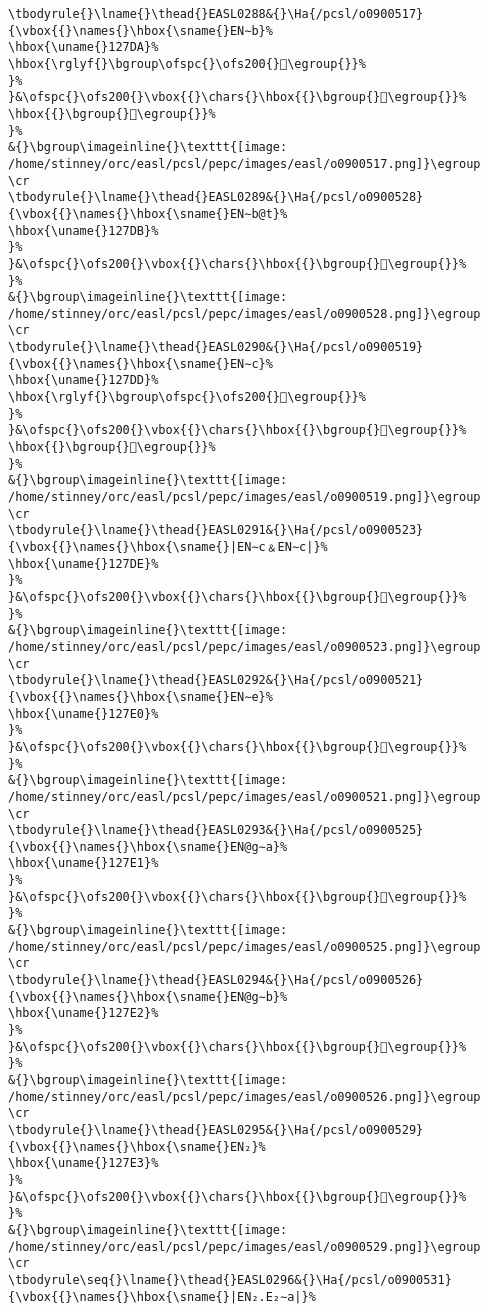 \begin{verbatim}
\tbodyrule{}\lname{}\thead{}EASL0288&{}\Ha{/pcsl/o0900517}{\vbox{{}\names{}\hbox{\sname{}EN∼b}%
\hbox{\uname{}127DA}%
\hbox{\rglyf{}\bgroup\ofspc{}\ofs200{}𒟚\egroup{}}%
}%
}&\ofspc{}\ofs200{}\vbox{{}\chars{}\hbox{{}\bgroup{}𒟚\egroup{}}%
\hbox{{}\bgroup{}𒟜\egroup{}}%
}%
&{}\bgroup\imageinline{}\texttt{[image: /home/stinney/orc/easl/pcsl/pepc/images/easl/o0900517.png]}\egroup
\cr
\tbodyrule{}\lname{}\thead{}EASL0289&{}\Ha{/pcsl/o0900528}{\vbox{{}\names{}\hbox{\sname{}EN∼b@t}%
\hbox{\uname{}127DB}%
}%
}&\ofspc{}\ofs200{}\vbox{{}\chars{}\hbox{{}\bgroup{}𒟛\egroup{}}%
}%
&{}\bgroup\imageinline{}\texttt{[image: /home/stinney/orc/easl/pcsl/pepc/images/easl/o0900528.png]}\egroup
\cr
\tbodyrule{}\lname{}\thead{}EASL0290&{}\Ha{/pcsl/o0900519}{\vbox{{}\names{}\hbox{\sname{}EN∼c}%
\hbox{\uname{}127DD}%
\hbox{\rglyf{}\bgroup\ofspc{}\ofs200{}𒟝\egroup{}}%
}%
}&\ofspc{}\ofs200{}\vbox{{}\chars{}\hbox{{}\bgroup{}𒟝\egroup{}}%
\hbox{{}\bgroup{}𒟟\egroup{}}%
}%
&{}\bgroup\imageinline{}\texttt{[image: /home/stinney/orc/easl/pcsl/pepc/images/easl/o0900519.png]}\egroup
\cr
\tbodyrule{}\lname{}\thead{}EASL0291&{}\Ha{/pcsl/o0900523}{\vbox{{}\names{}\hbox{\sname{}|EN∼c﹠EN∼c|}%
\hbox{\uname{}127DE}%
}%
}&\ofspc{}\ofs200{}\vbox{{}\chars{}\hbox{{}\bgroup{}𒟞\egroup{}}%
}%
&{}\bgroup\imageinline{}\texttt{[image: /home/stinney/orc/easl/pcsl/pepc/images/easl/o0900523.png]}\egroup
\cr
\tbodyrule{}\lname{}\thead{}EASL0292&{}\Ha{/pcsl/o0900521}{\vbox{{}\names{}\hbox{\sname{}EN∼e}%
\hbox{\uname{}127E0}%
}%
}&\ofspc{}\ofs200{}\vbox{{}\chars{}\hbox{{}\bgroup{}𒟠\egroup{}}%
}%
&{}\bgroup\imageinline{}\texttt{[image: /home/stinney/orc/easl/pcsl/pepc/images/easl/o0900521.png]}\egroup
\cr
\tbodyrule{}\lname{}\thead{}EASL0293&{}\Ha{/pcsl/o0900525}{\vbox{{}\names{}\hbox{\sname{}EN@g∼a}%
\hbox{\uname{}127E1}%
}%
}&\ofspc{}\ofs200{}\vbox{{}\chars{}\hbox{{}\bgroup{}𒟡\egroup{}}%
}%
&{}\bgroup\imageinline{}\texttt{[image: /home/stinney/orc/easl/pcsl/pepc/images/easl/o0900525.png]}\egroup
\cr
\tbodyrule{}\lname{}\thead{}EASL0294&{}\Ha{/pcsl/o0900526}{\vbox{{}\names{}\hbox{\sname{}EN@g∼b}%
\hbox{\uname{}127E2}%
}%
}&\ofspc{}\ofs200{}\vbox{{}\chars{}\hbox{{}\bgroup{}𒟢\egroup{}}%
}%
&{}\bgroup\imageinline{}\texttt{[image: /home/stinney/orc/easl/pcsl/pepc/images/easl/o0900526.png]}\egroup
\cr
\tbodyrule{}\lname{}\thead{}EASL0295&{}\Ha{/pcsl/o0900529}{\vbox{{}\names{}\hbox{\sname{}EN₂}%
\hbox{\uname{}127E3}%
}%
}&\ofspc{}\ofs200{}\vbox{{}\chars{}\hbox{{}\bgroup{}𒟣\egroup{}}%
}%
&{}\bgroup\imageinline{}\texttt{[image: /home/stinney/orc/easl/pcsl/pepc/images/easl/o0900529.png]}\egroup
\cr
\tbodyrule\seq{}\lname{}\thead{}EASL0296&{}\Ha{/pcsl/o0900531}{\vbox{{}\names{}\hbox{\sname{}|EN₂.E₂∼a|}%

\end{verbatim}
